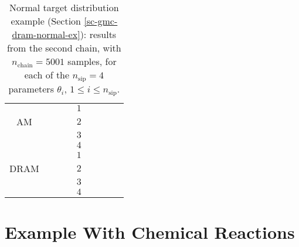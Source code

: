 \begin{table}[h!]
\begin{center}
\begin{tabular}{|c|c|c|c|c|c|c|c|c|}
\hline
\hline
       &          &                        &                        & $1$ &                          &                                &                        &                               \\
\cline{5-9}
AM     &          &                        &                        & $2$ &                          &                                &                        &                               \\
\cline{5-9}
       &          &                        &                        & $3$ &                          &                                &                        &                               \\
\cline{5-9}
       &          &                        &                        & $4$ &                          &                                &                        &                               \\
\hline
\hline
       &          &                        &                        & $1$ &                          &                                &                        &                               \\
\cline{5-9}
DRAM   &          &                        &                        & $2$ &                          &                                &                        &                               \\
\cline{5-9}
       &          &                        &                        & $3$ &                          &                                &                        &                               \\
\cline{5-9}
       &          &                        &                        & $4$ &                          &                                &                        &                               \\
\hline
\end{tabular}
\caption{Normal target distribution example (Section \ref{sc-gmc-dram-normal-ex}):
results from the second chain, with $n_{\text{chain}}=5001$ samples,
for each of the $n_{\text{sip}}=4$ parameters $\theta_i$, $1\leqslant i\leqslant n_{\text{sip}}$.
}
\label{tab-dram-normal-ex-results-2}
\end{center}
\end{table}

\clearpage

\section{Example With Chemical Reactions}\label{sc-gmc-dram-chem-ex}

